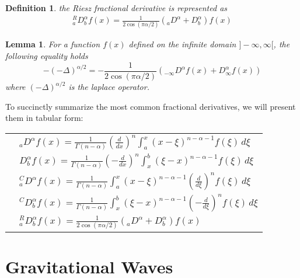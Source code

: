 \documentclass[a4paper,12pt]{extarticle}
\newtheorem{definition}{Definition}[section]
\newtheorem{Lemma}{Lemma}[section]
\numberwithin{equation}{subsection}
\begin{document}
\begin{definition}
the Riesz fractional derivative is represented as
\begin{align}
^R_aD_b^\alpha f(x)=\frac{1}{2\cos(\pi\alpha/2)}\left(_aD^\alpha+D_b^\alpha\right)f(x)
\end{align}
\end{definition}
\begin{Lemma}
For a function $f(x)$ defined on the infinite domain $]-\infty,\infty[$, the following equality holds
\begin{equation}
\label{eq:lap}
-(-\Delta)^{\alpha/2}=-\frac{1}{2\cos(\pi\alpha/2)}\left(_{-\infty}D^\alpha f(x)+D_\infty^\alpha f(x)\right)
\end{equation}
where $(-\Delta)^{\alpha/2}$ is the laplace operator.
\end{Lemma}
\noindent To succinctly summarize the most common fractional derivatives, we will present them in tabular form:
\begin{table}[H]
\centering
\begin{NiceTabular}{c|l}
\toprule
{} & $_aD^\alpha f(x)=\frac{1}{\Gamma(n-\alpha)}\left(\frac{d}{dx}\right)^n\int_a^x(x-\xi)^{n-\alpha-1}f(\xi)\,d\xi $\\
 & $D_b^\alpha f(x)=\frac{1}{\Gamma(n-\alpha)}\left(-\frac{d}{dx}\right)^n\int_x^b(\xi-x)^{n-\alpha-1}f(\xi)\,d\xi$\\ \midrule
  & $^C_aD^\alpha f(x)=\frac{1}{\Gamma(n-\alpha)}\int_a^x(x-\xi)^{n-\alpha-1}\left(\frac{d}{d\xi}\right)^nf(\xi)\,d\xi$\\
  & $^CD_b^\alpha f(x)=\frac{1}{\Gamma(n-\alpha)}\int_x^b(\xi-x)^{n-\alpha-1}\left(-\frac{d}{d\xi}\right)^nf(\xi)\,d\xi$\\ \midrule
{} & $^R_aD_b^\alpha f(x)=\frac{1}{2\cos(\pi\alpha/2)}\left(_aD^\alpha+D_b^\alpha\right)f(x)$\\ \bottomrule
\end{NiceTabular}
\end{table}
\section{Gravitational Waves}
\end{document}
